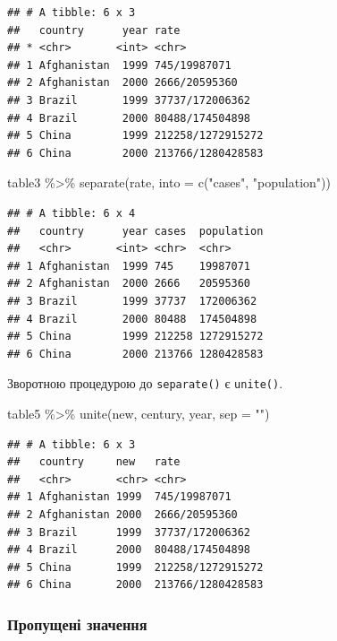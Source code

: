\documentclass[
]{book}
\newenvironment{Shaded}{\begin{snugshade}}{\end{snugshade}}
\newcommand{\AttributeTok}[1]{\textcolor[rgb]{0.77,0.63,0.00}{#1}}
\newcommand{\FunctionTok}[1]{\textcolor[rgb]{0.00,0.00,0.00}{#1}}
\newcommand{\NormalTok}[1]{#1}
\newcommand{\SpecialCharTok}[1]{\textcolor[rgb]{0.00,0.00,0.00}{#1}}
\newcommand{\StringTok}[1]{\textcolor[rgb]{0.31,0.60,0.02}{#1}}
\begin{document}
\begin{verbatim}
## # A tibble: 6 x 3
##   country      year rate             
## * <chr>       <int> <chr>            
## 1 Afghanistan  1999 745/19987071     
## 2 Afghanistan  2000 2666/20595360    
## 3 Brazil       1999 37737/172006362  
## 4 Brazil       2000 80488/174504898  
## 5 China        1999 212258/1272915272
## 6 China        2000 213766/1280428583
\end{verbatim}

\begin{Shaded}
\begin{Highlighting}[]
\NormalTok{table3 }\SpecialCharTok{\%\textgreater{}\%} 
  \FunctionTok{separate}\NormalTok{(rate, }\AttributeTok{into =} \FunctionTok{c}\NormalTok{(}\StringTok{"cases"}\NormalTok{, }\StringTok{"population"}\NormalTok{))}
\end{Highlighting}
\end{Shaded}

\begin{verbatim}
## # A tibble: 6 x 4
##   country      year cases  population
##   <chr>       <int> <chr>  <chr>     
## 1 Afghanistan  1999 745    19987071  
## 2 Afghanistan  2000 2666   20595360  
## 3 Brazil       1999 37737  172006362 
## 4 Brazil       2000 80488  174504898 
## 5 China        1999 212258 1272915272
## 6 China        2000 213766 1280428583
\end{verbatim}

Зворотною процедурою до \texttt{separate()} є \texttt{unite()}.

\begin{Shaded}
\begin{Highlighting}[]
\NormalTok{table5 }\SpecialCharTok{\%\textgreater{}\%} 
  \FunctionTok{unite}\NormalTok{(new, century, year, }\AttributeTok{sep =} \StringTok{""}\NormalTok{)}
\end{Highlighting}
\end{Shaded}

\begin{verbatim}
## # A tibble: 6 x 3
##   country     new   rate             
##   <chr>       <chr> <chr>            
## 1 Afghanistan 1999  745/19987071     
## 2 Afghanistan 2000  2666/20595360    
## 3 Brazil      1999  37737/172006362  
## 4 Brazil      2000  80488/174504898  
## 5 China       1999  212258/1272915272
## 6 China       2000  213766/1280428583
\end{verbatim}

\hypertarget{ux43fux440ux43eux43fux443ux449ux435ux43dux456-ux437ux43dux430ux447ux435ux43dux43dux44f}{%
\subsubsection{Пропущені значення}\label{ux43fux440ux43eux43fux443ux449ux435ux43dux456-ux437ux43dux430ux447ux435ux43dux43dux44f}}
\end{document}
